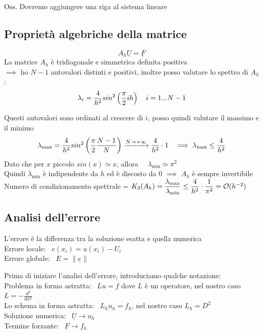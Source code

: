 \documentclass{article}
\renewcommand{\vv}[1]{\underline{#1}}
\begin{document}
Oss. Dovremo aggiungere una riga al sistema lineare\\


\subsection{Proprietà algebriche della matrice
}

\[
A_h\vv{U}=\vv{F}
\]
La matrice $A_h$ è tridiagonale e simmetrica definita positiva\\
$\implies$ ho $N-1$ autovalori distinti e positivi, inoltre posso valutare lo spettro di $A_h$:
\[
\lambda_i = \dfrac{4}{h^2} sin^2\left(\dfrac{\pi}{2}ih\right) \ \ \ i=1...N-1
\]

Questi autovalori sono ordinati al crescere di $i$, posso quindi valutare il massimo e il minimo
\[
\lambda_{\text{max}} = \frac{4}{h^2} sin^2\O\frac{\pi}{2}\frac{N-1}{N}\C \xrightarrow{N\to+\infty}\frac{4}{h^2}\cdot 1 \ \ \implies \lambda_{\text{max}}\le \frac{4}{h^2}\skipp
\]
Dato che per $x$ piccolo $sin(x)\simeq x$, allora \ \ $\lambda_{\text{min}}\simeq \pi^2$\\
Quindi $\lambda_{\text{min}}$ è indipendente da $h$ ed è discosto da 0 $\implies$ $A_h$ è sempre invertibile \\

Numero di condizionamento spettrale = $K_2(A_h)=\dfrac{\lambda_{\text{max}}}{\lambda_{\text{min}}} \le \dfrac{4}{h^2}\cdot \dfrac{1}{\pi^2} = \mathcal O(h^{-2})$
\newpage %



\subsection{Analisi dell'errore}

\begin{defi}
L'errore è la differenza tra la soluzione esatta e quella numerica\\
Errore locale: \ $e(x_i)=u(x_i)-U_i$\\
Errore globale: \ $E=\|\vv{e}\|$
\end{defi}

\phantom{}

Prima di iniziare l'analisi dell'errore, introduciamo qualche notazione:\\
Problema in forma astratta: \ $Lu=f$ dove $L$ è un operatore, nel nostro caso $L=-\frac{d^2}{dx^2}$\\
Lo schema in forma astratta: \ $L_hu_h=f_h$, nel nostro caso $L_h=D^2$\\
Soluzione numerica: \ $\vv{U} \to u_h$\\
Termine forzante: \ $\vv{F}\to f_h$\\
\end{document}
